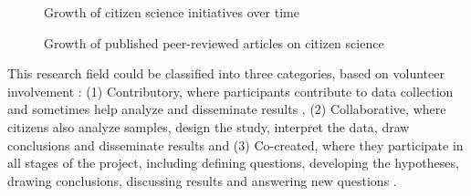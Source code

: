 \begin{figure}[!h]
    \centering
    \caption{Growth of citizen science initiatives over time}
    \label{fig:growth-citizen-science-projects}
\end{figure}

\begin{figure}[!h]
    \centering
    \caption{Growth of published peer-reviewed articles on citizen science}
    \label{fig:growth-publications}
\end{figure}

This research field could be classified into three categories, based on volunteer involvement \cite{follett2015analysis}: (1) Contributory, where participants contribute to data collection and sometimes help analyze and disseminate results \cite{bonney2009citizen}, (2) Collaborative, where citizens also analyze samples, design the study, interpret the data, draw conclusions and disseminate results \cite{faridani2009networked} and (3) Co-created, where they participate in all stages of the project, including defining questions, developing the hypotheses, drawing conclusions, discussing results and answering new questions \cite{hill2012notes}.

